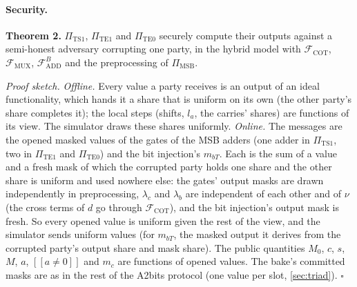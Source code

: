 \paragraph{Security.} \textbf{Theorem 2.} $\Pi_{\mathrm{TS1}}$, $\Pi_{\mathrm{TE1}}$ and $\Pi_{\mathrm{TE0}}$ securely
compute their outputs against a semi-honest adversary corrupting one party, in the hybrid model with
$\mathcal{F}_{\mathrm{COT}}$, $\mathcal{F}_{\mathrm{MUX}}$, $\mathcal{F}^{B}_{\mathrm{ADD}}$ and the preprocessing of
$\Pi_{\mathrm{MSB}}$.

\emph{Proof sketch.} \emph{Offline.} Every value a party receives is an output of an ideal functionality, which
hands it a share that is uniform on its own (the other party's share completes it); the local steps (shifts,
$l_a$, the carries' shares) are functions of its view. The simulator draws these shares uniformly. \emph{Online.}
The messages are the opened masked values of the gates of the MSB adders (one adder in $\Pi_{\mathrm{TS1}}$, two in
$\Pi_{\mathrm{TE1}}$ and $\Pi_{\mathrm{TE0}}$) and the bit injection's $m_{bT}$. Each is the sum of a value and a fresh
mask of which the corrupted party holds one share and the other share is uniform and used nowhere else: the gates'
output masks are drawn independently in preprocessing, $\lambda_c$ and $\lambda_b$ are independent of each other and
of $\nu$ (the cross terms of $d$ go through $\mathcal{F}_{\mathrm{COT}}$), and the bit injection's output mask is fresh.
So every opened value is uniform given the rest of the view, and the simulator sends uniform values (for $m_{bT}$, the
masked output it derives from the corrupted party's output share and mask share). The public quantities $M_0$, $c$,
$s$, $M$, $a$, $[\![a \neq 0]\!]$ and $m_c$ are functions of opened values. The bake's committed masks are as in the
rest of the A2bits protocol (one value per slot, \cref{sec:triad}). \hfill$\square$

